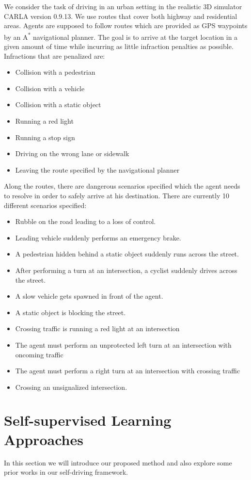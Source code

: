 \documentclass[letterpaper, 12pt]{article}
\theoremstyle{definition}
\theoremstyle{definition}
\theoremstyle{definition}
\theoremstyle{definition}
\theoremstyle{definition}
\begin{document}
We consider the task of driving in an urban setting in the realistic 3D simulator
CARLA version 0.9.13. We use routes that cover both highway and residential
areas. Agents are supposed to follow routes which are provided as GPS waypoints
by an A\textsuperscript{*} navigational planner. The goal is to arrive at the target location in a given
amount of time while incurring as little infraction penalties as possible. Infractions
that are penalized are:
\begin{itemize}
\item Collision with a pedestrian
\item Collision with a vehicle
\item Collision with a static object
\item Running a red light
\item Running a stop sign
\item Driving on the wrong lane or sidewalk
\item Leaving the route specified by the navigational planner
\end{itemize}
Along the routes, there are dangerous scenarios specified which the agent needs to
resolve in order to safely arrive at his destination. There are currently 10 different
scenarios specified:
\begin{itemize}
\item Rubble on the road leading to a loss of control.
\item Leading vehicle suddenly performs an emergency brake.
\item A pedestrian hidden behind a static object suddenly runs across the street.
\item After performing a turn at an intersection, a cyclist suddenly drives across
the street.
\item A slow vehicle gets spawned in front of the agent.
\item A static object is blocking the street.
\item Crossing traffic is running a red light at an intersection
\item The agent must perform an unprotected left turn at an intersection with oncoming traffic
\item The agent must perform a right turn at an intersection with crossing traffic
\item Crossing an unsignalized intersection.
\end{itemize}

\section{Self-supervised Learning Approaches}
\label{sec:orga1ef3db}
In this section we will introduce our proposed method and also explore some
prior works in our self-driving framework.
\end{document}
